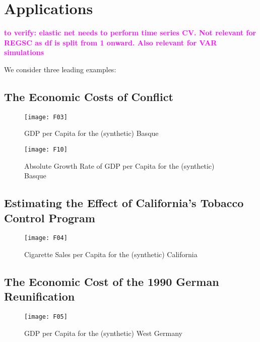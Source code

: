 \section{Applications}

\textcolor{magenta}{\textbf{to verify: elastic net needs to perform time series CV. Not relevant for REGSC as df is split  from 1 onward. Also relevant for VAR simulations}}
 
We consider three leading examples:


\subsection{The Economic Costs of Conflict}
\cite{abadie:2003}
\begin{figure}[H]
	\centering
	\texttt{[image: F03]}
	\caption{GDP per Capita for the (synthetic) Basque}
	\label{F_03}
\end{figure}

\begin{figure}[H]
	\centering
	\texttt{[image: F10]}
	\caption{Absolute Growth Rate of GDP per Capita for the (synthetic) Basque}
	\label{F_06}
\end{figure}

\newpage
\subsection{Estimating the Effect of California’s Tobacco Control Program}
\cite{abadie:2010}
\begin{figure}[H]
	\centering
	\texttt{[image: F04]}
	\caption{Cigarette Sales per Capita for the (synthetic) California}
	\label{F_04}
\end{figure}

\newpage
\subsection{The Economic Cost of the 1990 German Reunification}
\cite{abadie:2015}
\begin{figure}[H]
	\centering
	\texttt{[image: F05]}
	\caption{GDP per Capita for the (synthetic) West Germany}
	\label{F_05}
\end{figure}